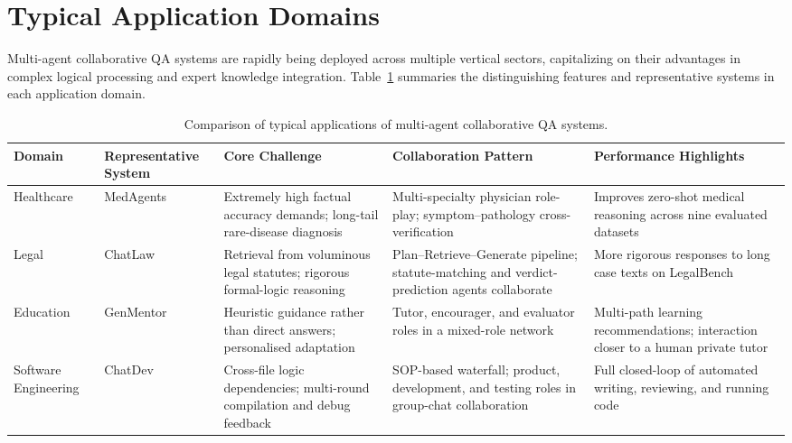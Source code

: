 \section{Typical Application Domains}
\label{sec:applications}

Multi-agent collaborative QA systems are rapidly being deployed across
multiple vertical sectors, capitalizing on their advantages in complex
logical processing and expert knowledge integration.
Table~\ref{tab:app_compare} summaries the distinguishing features and
representative systems in each application domain.

\begin{table}[pos=t]
  \centering
  \caption{Comparison of typical applications of multi-agent collaborative QA systems.}
  \label{tab:app_compare}
  \small
  \setlength{\tabcolsep}{3pt}
  \begin{tabular}{p{1.8cm} p{2.4cm} p{4.0cm} p{4.0cm} p{4.0cm}}
    \toprule
    \textbf{Domain} & \textbf{Representative System} &
    \textbf{Core Challenge} & \textbf{Collaboration Pattern} &
    \textbf{Performance Highlights} \\
    \midrule
    Healthcare &
      MedAgents \citep{tang2024medagents} &
      Extremely high factual accuracy demands; long-tail rare-disease diagnosis &
      Multi-specialty physician role-play; symptom--pathology cross-verification &
      Improves zero-shot medical reasoning across nine evaluated datasets \\[6pt]
    Legal &
      ChatLaw \citep{cui2023chatlaw} &
      Retrieval from voluminous legal statutes; rigorous formal-logic reasoning &
      Plan--Retrieve--Generate pipeline; statute-matching and verdict-prediction agents collaborate &
      More rigorous responses to long case texts on LegalBench \\[6pt]
    Education &
      GenMentor \citep{li2024genmentor} &
      Heuristic guidance rather than direct answers; personalised adaptation &
      Tutor, encourager, and evaluator roles in a mixed-role network &
      Multi-path learning recommendations; interaction closer to a human private tutor \\[6pt]
    Software Engineering &
      ChatDev \citep{qian2023chatdev} &
      Cross-file logic dependencies; multi-round compilation and debug feedback &
      SOP-based waterfall; product, development, and testing roles in group-chat collaboration &
      Full closed-loop of automated writing, reviewing, and running code \\
    \bottomrule
  \end{tabular}
\end{table}

